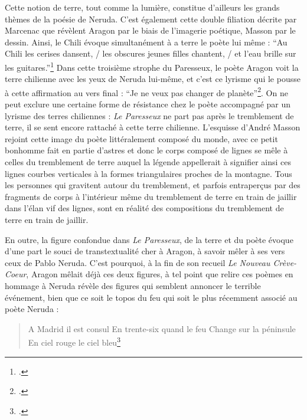 Cette notion de terre, tout comme la lumière, constitue d’ailleurs les grands thèmes de la poésie de Neruda. C’est également cette double filiation décrite par Marcenac que révèlent Aragon par le biais de l’imagerie poétique, Masson par le dessin. Ainsi, le Chili évoque simultanément à a terre le poète lui même : \enquote{Au Chili les cerises dansent, / les obscures jeunes filles chantent, / et l'eau brille sur les guitares.}\footcite{pabloneruda} Dans cette troisième strophe du Paresseux, le poète Aragon voit la terre chilienne avec les yeux de Neruda lui-même, et c’est ce lyrisme qui le pousse à cette affirmation au vers final : \enquote{Je ne veux pas changer de planète}\footcite{pabloneruda}.  On ne peut exclure une certaine forme de résistance chez le poète accompagné par un lyrisme des terres chiliennes : \emph{Le Paresseux }ne part pas après le tremblement de terre, il se sent encore rattaché à cette terre chilienne. L’esquisse d’André Masson rejoint cette image du poète littéralement composé du monde, avec ce petit bonhomme fait en partie d’astres et donc le corps composé de lignes se mêle à celles du tremblement de terre auquel la légende appellerait à signifier ainsi ces lignes courbes verticales à la formes triangulaires proches de la montagne. Tous les personnes qui gravitent autour du tremblement, et parfois entraperçus par des fragments de corps à l’intérieur même du tremblement de terre en train de jaillir dans l’élan vif des lignes, sont en réalité des compositions du tremblement de terre en train de jaillir. 

	En outre, la figure confondue dans \emph{Le Paresseux}, de la terre et du poète évoque d’une part le souci de transtextualité cher à Aragon, à savoir mêler à ses vers ceux de Pablo Neruda. C’est pourquoi, à la fin de son recueil \emph{Le Nouveau Crève-Coeur}, Aragon mêlait déjà ces deux figures, à tel point que relire ces poèmes en hommage à Neruda révèle des figures qui semblent annoncer le terrible événement, bien que ce soit le topos du feu qui soit le plus récemment associé au poète Neruda : 



\begin{verse}
A Madrid il est consul 
En trente-six quand le feu
Change sur la péninsule
En ciel rouge le ciel bleu\footcite{pabloneruda}	
\end{verse}
 
